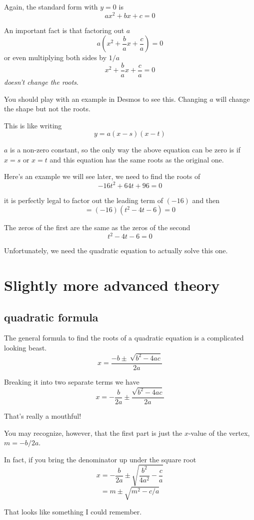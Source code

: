 \documentclass[11pt, oneside]{article}
\begin{document}
Again, the standard form with $y = 0$ is
\[ ax^2 + bx + c = 0 \]

An important fact is that factoring out $a$
\[ a(x^2 + \frac{b}{a} x + \frac{c}{a}) = 0 \]
or even multiplying both sides by $1/a$
\[ x^2 + \frac{b}{a} x + \frac{c}{a} = 0 \]
\emph{doesn't change the roots}.

You should play with an example in Desmos to see this.  Changing $a$ will change the shape but not the roots.

This is like writing
\[ y = a(x - s)(x - t) \]

$a$ is a non-zero constant, so the only way the above equation can be zero is if $x = s$ or $x = t$ and this equation has the same roots as the original one.

Here's an example we will see later, we need to find the roots of
\[ -16t^2 + 64t + 96 = 0 \]

it is perfectly legal to factor out the leading term of $(-16)$ and then
\[ = (-16) (t^2 - 4t - 6) = 0 \]

The zeros of the first are the same as the zeros of the second
\[ t^2 - 4t - 6 = 0 \]

Unfortunately, we need the quadratic equation to actually solve this one.

\section*{Slightly more advanced theory}

\subsection*{quadratic formula}

The general formula to find the roots of a quadratic equation is a complicated looking beast.
\[ x = \frac{-b \pm \ \sqrt{b^2 - 4ac}}{2a} \]

Breaking it into two separate terms we have
\[ x = - \frac{b}{2a} \pm \frac{\sqrt{b^2 - 4ac}}{2a} \]

That's really a mouthful!

You may recognize, however, that the first part is just the $x$-value of the vertex, $m = -b/2a$.

In fact, if you bring the denominator up under the square root
\[ x =  - \frac{b}{2a} \pm \sqrt{\frac{b^2}{4a^2} - \frac{c}{a}} \]
\[ = m \pm \sqrt{m^2 - c/a} \]

That looks like something I could remember.
\end{document}
